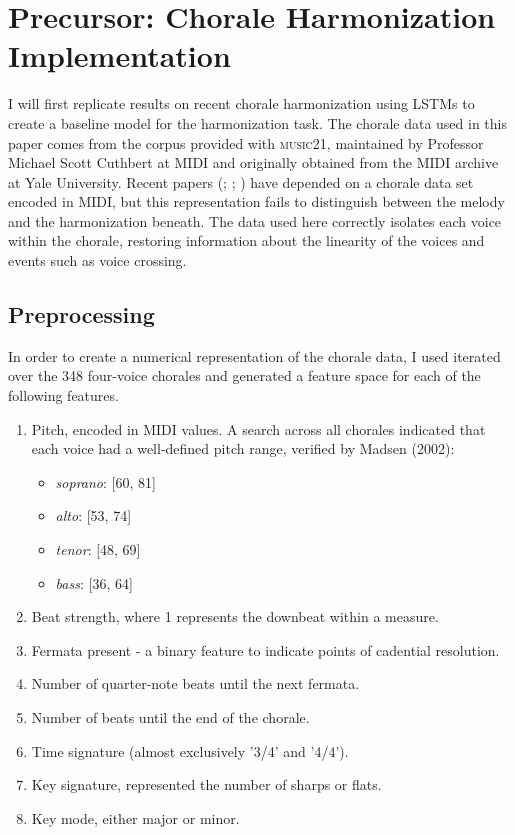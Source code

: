 \documentclass[11pt]{article}
\begin{document}
\section{Precursor: Chorale Harmonization Implementation}

I will first replicate results on recent chorale harmonization using LSTMs to create a baseline model for the harmonization task.
The chorale data used in this paper comes from the corpus provided with \textsc{music21}, maintained by Professor Michael Scott Cuthbert at MIDI and originally obtained from the MIDI archive at Yale University. Recent papers (\cite{greff2015lstm}; \cite{allan2005harmonising}; \cite{goel2014polyphonic}) have depended on a chorale data set encoded in MIDI, but this representation fails to distinguish between the melody and the harmonization beneath. The data used here correctly isolates each voice within the chorale, restoring information about the linearity of the voices and events such as voice crossing.

\subsection{Preprocessing}

In order to create a numerical representation of the chorale data, I used iterated over the 348 four-voice chorales and generated a feature space for each of the following features.

\begin{enumerate}
\item Pitch, encoded in MIDI values. A search across all chorales indicated that each voice had a well-defined pitch range, verified by Madsen (2002): 
\begin{itemize}
\item \textit{soprano}: [60, 81]
\item \textit{alto}: [53, 74]
\item \textit{tenor}: [48, 69]
\item \textit{bass}: [36, 64]
\end{itemize}
\item Beat strength, where 1 represents the downbeat within a measure.
\item Fermata present - a binary feature to indicate points of cadential resolution.
\item Number of quarter-note beats until the next fermata.
\item Number of beats until the end of the chorale.
\item Time signature (almost exclusively '3/4' and '4/4').
\item Key signature, represented the number of sharps or flats.
\item Key mode, either major or minor.
\end{enumerate}
\end{document}
